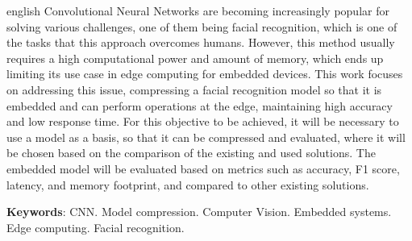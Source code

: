 \setlength{\absparsep}{18pt} %
\begin{resumo}[Abstract]
 \begin{otherlanguage*}{english}
   Convolutional Neural Networks are becoming increasingly popular for solving various challenges, one of them being
   facial recognition, which is one of the tasks that this approach overcomes humans.
   However, this method usually requires a high computational power and amount of memory, which ends up limiting its
   use case in edge computing for embedded devices.
   This work focuses on addressing this issue, compressing a facial recognition model so that it is embedded and can
   perform operations at the edge, maintaining high accuracy and low response time.
   For this objective to be achieved, it will be necessary to use a model as a basis, so that it can be compressed and
   evaluated, where it will be chosen based on the comparison of the existing and used solutions.
   The embedded model will be evaluated based on metrics such as accuracy, F1 score, latency, and memory footprint,
   and compared to other existing solutions.

   \vspace{\onelineskip}

   \noindent
   \textbf{Keywords}: CNN. Model compression. Computer Vision. Embedded systems. Edge computing. Facial recognition.
 \end{otherlanguage*}
\end{resumo}
